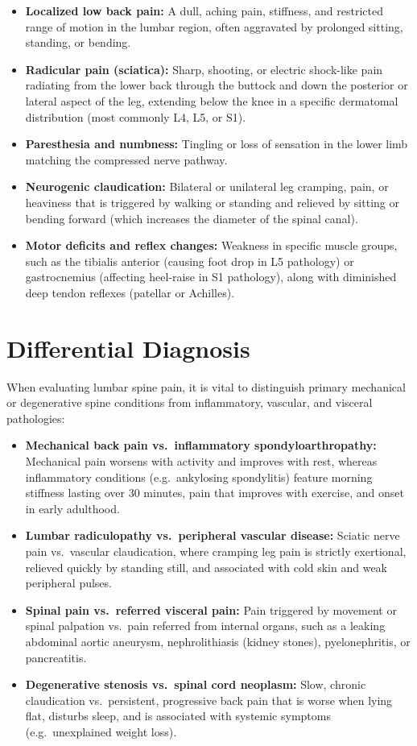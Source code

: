 \begin{itemize}
    \item \textbf{Localized low back pain:} A dull, aching pain, stiffness, and restricted range of motion in the lumbar region, often aggravated by prolonged sitting, standing, or bending.
    \item \textbf{Radicular pain (sciatica):} Sharp, shooting, or electric shock-like pain radiating from the lower back through the buttock and down the posterior or lateral aspect of the leg, extending below the knee in a specific dermatomal distribution (most commonly L4, L5, or S1).
    \item \textbf{Paresthesia and numbness:} Tingling or loss of sensation in the lower limb matching the compressed nerve pathway.
    \item \textbf{Neurogenic claudication:} Bilateral or unilateral leg cramping, pain, or heaviness that is triggered by walking or standing and relieved by sitting or bending forward (which increases the diameter of the spinal canal).
    \item \textbf{Motor deficits and reflex changes:} Weakness in specific muscle groups, such as the tibialis anterior (causing foot drop in L5 pathology) or gastrocnemius (affecting heel-raise in S1 pathology), along with diminished deep tendon reflexes (patellar or Achilles).
\end{itemize}

\section*{Differential Diagnosis}
When evaluating lumbar spine pain, it is vital to distinguish primary mechanical or degenerative spine conditions from inflammatory, vascular, and visceral pathologies:

\begin{itemize}
    \item \textbf{Mechanical back pain vs.\ inflammatory spondyloarthropathy:} Mechanical pain worsens with activity and improves with rest, whereas inflammatory conditions (e.g.\ ankylosing spondylitis) feature morning stiffness lasting over 30 minutes, pain that improves with exercise, and onset in early adulthood.
    \item \textbf{Lumbar radiculopathy vs.\ peripheral vascular disease:} Sciatic nerve pain vs.\ vascular claudication, where cramping leg pain is strictly exertional, relieved quickly by standing still, and associated with cold skin and weak peripheral pulses.
    \item \textbf{Spinal pain vs.\ referred visceral pain:} Pain triggered by movement or spinal palpation vs.\ pain referred from internal organs, such as a leaking abdominal aortic aneurysm, nephrolithiasis (kidney stones), pyelonephritis, or pancreatitis.
    \item \textbf{Degenerative stenosis vs.\ spinal cord neoplasm:} Slow, chronic claudication vs.\ persistent, progressive back pain that is worse when lying flat, disturbs sleep, and is associated with systemic symptoms (e.g.\ unexplained weight loss).
\end{itemize}

